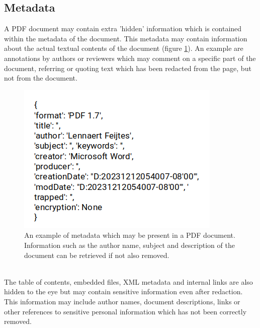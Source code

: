 \subsection{Metadata}
A PDF document may contain extra 'hidden' information which is contained within the metadata of the document. This metadata may contain information about the actual textual contents of the document (figure \ref{fig:metadataexmp}). An example are annotations by authors or reviewers which may comment on a specific part of the document, referring or quoting text which has been redacted from the page, but not from the document. 
\begin{figure}[h]
    \includegraphics[width=0.5\linewidth]{latex/media/metadata.png}
    \centering
    \caption{An example of metadata which may be present in a PDF document. Information such as the author name, subject and description of the document can be retrieved if not also removed.}
    \label{fig:metadataexmp}
\end{figure}\\
The table of contents, embedded files, XML metadata and internal links are also hidden to the eye but may contain sensitive information even after redaction. This information may include author names, document descriptions, links or other references to sensitive personal information which has not been correctly removed.

